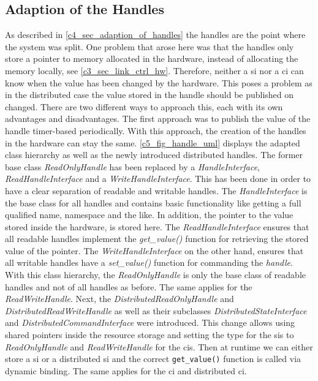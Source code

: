 \subsection{Adaption of the Handles}
As described in \autoref{c4_sec_adaption_of_handles} the \glspl{handle} are the point where the system was split. One problem that arose here was that the \glspl{handle} only store a pointer to memory allocated in the hardware, instead of allocating the memory locally, see \autoref{c3_sec_link_ctrl_hw}. Therefore, neither a \gls{si} nor a \gls{ci} can know when the value has been changed by the hardware. This poses a problem as in the distributed case the value stored in the \gls{handle} should be published on changed. There are two different ways to approach this, each with its own advantages and disadvantages. The first approach was to publish the value of the \gls{handle} timer-based periodically. With this approach, the creation of the \glspl{handle} in the hardware can stay the same. \autoref{c5_fig_handle_uml} displays the adapted class hierarchy as well as the newly introduced distributed \glspl{handle}. The former base class \textit{ReadOnlyHandle} has been replaced by a \textit{HandleInterface}, \textit{ReadHandleInterface} and a \textit{WriteHandleInterface}. This has been done in order to have a clear separation of readable and writable \glspl{handle}. The \textit{HandleInterface} is the base class for all \glspl{handle} and contains basic functionality like getting a full qualified name, namespace and the like. In addition, the pointer to the value stored inside the hardware, is stored here. The \textit{ReadHandleInterface} ensures that all readable \glspl{handle} implement the \textit{get\_value()} function for retrieving the stored value of the pointer. The \textit{WriteHandleInterface} on the other hand, ensures that all writable \glspl{handle} have a \textit{set\_value()} function for commanding the \textit{handle}. \newline
With this class hierarchy, the \textit{ReadOnlyHandle} is only the base class of readable \glspl{handle} and not of all \glspl{handle} as before. The same applies for the \textit{ReadWriteHandle}. Next, the \textit{DistributedReadOnlyHandle} and \textit{DistributedReadWriteHandle} as well as their subclasses \textit{DistributedStateInterface} and \textit{DistributedCommandInterface} were introduced. This change allows using shared pointers inside the resource storage and setting the type for the \glspl{si} to \textit{ReadOnlyHandle} and \textit{ReadWriteHandle} for the \glspl{ci}. Then at runtime we can either store a \gls{si} or a distributed \gls{si} and the correct \lstset{language=C++,basicstyle=\small\ttfamily}\lstinline{get_value()} function is called via dynamic binding. The same applies for the \gls{ci} and distributed \gls{ci}. \newline
